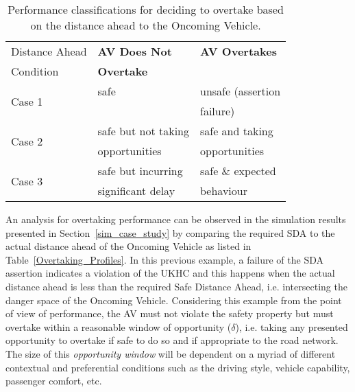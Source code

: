 \begin{table}[]
\centering
\begin{tabular}{|p{2.3cm}|p{2.3cm}|p{2.3cm}|}
\hline
\multicolumn{1}{|l|}{Distance Ahead} & \multicolumn{1}{l|}{\textbf{AV Does Not }} & \multicolumn{1}{l|}{\textbf{AV Overtakes}} \\ 
Condition & \textbf{Overtake} & \\
\hline
\multirow{2}{*}{Case 1} & safe & unsafe (assertion \\
& & failure) \\
\hline
\multirow{2}{*}{Case 2} & safe but not taking & safe and taking\\ 
& opportunities & opportunities\\
\hline
\multirow{2}{*}{Case 3} & safe but incurring  & safe \& expected  \\ 
& significant delay & behaviour\\
\hline
\end{tabular}
\caption{Performance classifications for deciding to overtake based on the distance ahead to the Oncoming Vehicle.}
\label{performance_metric_table}
\end{table}

An analysis for overtaking performance can be observed in the simulation results presented in Section~\ref{sim_case_study} by comparing the required SDA to the actual distance ahead of the Oncoming Vehicle as listed in Table~\ref{Overtaking_Profiles}. In this previous example, a failure of the SDA assertion indicates a violation of the UKHC and this happens when the actual distance ahead is less than the required Safe Distance Ahead, i.e. intersecting the danger space of the Oncoming Vehicle. Considering this example from the point of view of performance, the AV must not violate the safety property but must overtake within a reasonable window of opportunity ($\delta$), i.e. taking any presented opportunity to overtake if safe to do so and if appropriate to the road network. 
%
%
The size of this \emph{opportunity window} will be dependent on a myriad of different contextual and preferential conditions such as the driving style, vehicle capability, passenger comfort, etc. 

